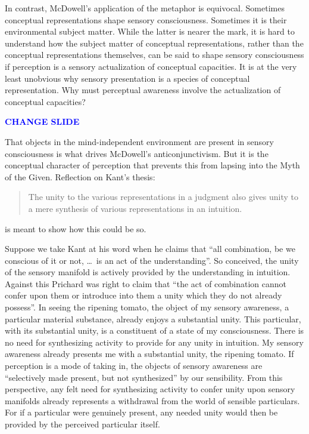 \documentclass[12pt]{article}
\newcommand{\change}{\textcolor{blue}{\textbf{CHANGE SLIDE}}}
\begin{document}
In contrast, McDowell's application of the metaphor is equivocal. Sometimes conceptual representations shape sensory consciousness. Sometimes it is their environmental subject matter. While the latter is nearer the mark, it is hard to understand how the subject matter of conceptual representations, rather than the conceptual representations themselves, can be said to shape sensory consciousness if perception is a sensory actualization of conceptual capacities. It is at the very least unobvious why sensory presentation is a species of conceptual representation. Why must perceptual awareness involve the actualization of conceptual capacities?

\change

That objects in the mind-independent environment are present in sensory consciousness is what drives McDowell's anticonjunctivism. But it is the conceptual character of perception that prevents this from lapsing into the Myth of the Given. Reflection on Kant's thesis:
\begin{quote}
    The unity to the various representations in a judgment also gives unity to a mere synthesis of various representations in an intuition.
\end{quote}
is meant to show how this could be so.

Suppose we take Kant at his word when he claims that ``all combination, be we conscious of it or not, \ldots\ is an act of the understanding''. So conceived, the unity of the sensory manifold is actively provided by the understanding in intuition. Against this  Prichard was right to claim that ``the act of combination cannot confer upon them or introduce into them a unity which they do not already possess''. In seeing the ripening tomato, the object of my sensory awareness, a particular material substance, already enjoys a substantial unity. This particular, with its substantial unity, is a constituent of a state of my consciousness. There is no need for synthesizing activity to provide for any unity in intuition. My sensory awareness already presents me with a substantial unity, the ripening tomato. If perception is a mode of taking in, the objects of sensory awareness are ``selectively made present, but not synthesized'' by our sensibility. From this perspective, any felt need for synthesizing activity to confer unity upon sensory manifolds already represents a withdrawal from the world of sensible particulars. For if a particular were genuinely present, any needed unity would then be provided by the perceived particular itself.
\end{document}
